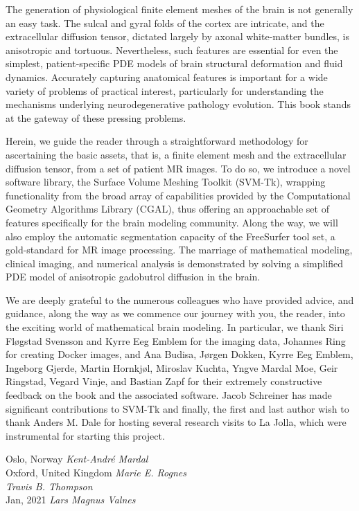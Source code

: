The generation of physiological finite element meshes of the brain is
not generally an easy task. The sulcal and gyral folds of the cortex
are intricate, and the extracellular diffusion tensor, dictated
largely by axonal white-matter bundles, is anisotropic and
tortuous. Nevertheless, such features are essential for even the
simplest, patient-specific PDE models of brain structural deformation
and fluid dynamics. Accurately capturing anatomical features is
important for a wide variety of problems of practical interest,
particularly for understanding the mechanisms underlying
neurodegenerative pathology evolution. This book stands at the gateway
of these pressing problems.

Herein, we guide the reader through a straightforward methodology for
ascertaining the basic assets, that is, a finite element mesh and the
extracellular diffusion tensor, from a set of patient MR images. To do
so, we introduce a novel software library, the Surface Volume Meshing
Toolkit (SVM-Tk), wrapping functionality from the broad array of
capabilities provided by the Computational Geometry Algorithms Library
(CGAL), thus offering an approachable set of features specifically for
the brain modeling community. Along the way, we will also employ the
automatic segmentation capacity of the FreeSurfer tool set, a
gold-standard for MR image processing. The marriage of mathematical
modeling, clinical imaging, and numerical analysis is demonstrated by
solving a simplified PDE model of anisotropic gadobutrol diffusion in
the brain.

We are deeply grateful to the numerous colleagues who have provided
advice, and guidance, along the way as we commence our journey with
you, the reader, into the exciting world of mathematical brain
modeling. In particular, we thank Siri Fl\o gstad Svensson and Kyrre
Eeg Emblem for the imaging data, Johannes Ring for creating Docker
images, and Ana Budisa, J\o rgen Dokken, Kyrre Eeg Emblem, Ingeborg
Gjerde, Martin Hornkj\o l, Miroslav Kuchta, Yngve Mardal Moe, Geir
Ringstad, Vegard Vinje, and Bastian Zapf for their extremely
constructive feedback on the book and the associated software. 
Jacob Schreiner has made significant contributions to SVM-Tk and
finally, the first and last author wish to thank 
Anders M. Dale for hosting several research visits to La Jolla, 
which were instrumental for starting this project. 


\vspace{\baselineskip}
\begin{flushright}\noindent
Oslo, Norway \hfill {\it Kent-Andr\'e Mardal}\\ 
Oxford, United Kingdom   \hfill {\it Marie E. Rognes}\\ 
             \hfill {\it Travis B. Thompson}\\ 
Jan, 2021    \hfill {\it Lars Magnus Valnes}\\ 
\end{flushright}



